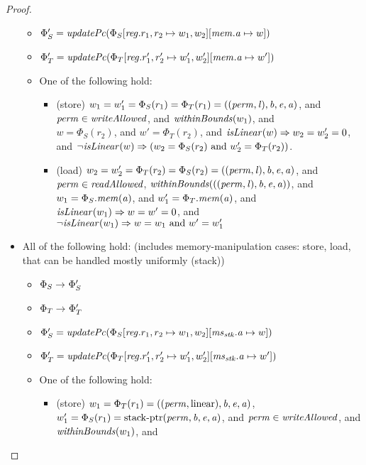 \documentclass[a4paper]{article}
\begin{document}
\begin{proof}
\begin{itemize}
\begin{itemize}
  \item $\Phi_S' =
    \updPcAddr{\Phi_S\updReg{r_1,r_2}{w_1,w_2}\update{\mem.\aaddr}{w}}$
  \item $\Phi_T' =
    \updPcAddr{\Phi_T\updReg{r_1',r_2'}{w_1',w_2'}\update{\mem.\aaddr}{w'}}$
  \item One of the following hold:
    \begin{itemize}
    \item (store) $w_1 = w_1' = \Phi_S(r_1) = \Phi_T(r_1) =
      ((\mathit{perm},\mathit{l}),\mathit{b},\mathit{e},\mathit{a})$, and $\perm \in \writeAllowed{}$,
      and
      $\withinBounds{w_1}$, and\\
      $w = \Phi_S(r_2)$, and $w' = \Phi_T(r_2)$, and $\isLinear{w} \Rightarrow
      w_2 = w_2' = 0$, and $\neg \isLinear{w} \Rightarrow (w_2 = \Phi_S(r_2)
      \text{ and } w_2' = \Phi_T(r_2))$.
    \item (load) $w_2 = w_2' = \Phi_T(r_2) = \Phi_S(r_2) =
      ((\mathit{perm},\mathit{l}),\mathit{b},\mathit{e},\mathit{a})$, and $\perm \in \readAllowed{}$,
      $\withinBounds{((\perm,\lin),\baddr,\eaddr,\aaddr)}$, and \\
      $w_1 = \Phi_S.\mathit{mem}(\mathit{a})$, and $w_1' = \Phi_T.\mathit{mem}(\mathit{a})$, and \\
      $\isLinear{w_1} \Rightarrow w = w' = 0$, and \\
      $\neg \isLinear{w_1} \Rightarrow w = w_1 \text{ and } w' = w_1'$
    \end{itemize}
  \end{itemize}
\item All of the following hold: (includes memory-manipulation cases: store, load, that can be handled mostly uniformly (stack))
  \begin{itemize}
  \item $\Phi_S \rightarrow^{} \Phi_S'$
  \item $\Phi_T \rightarrow^{} \Phi_T'$
  \item $\Phi_S' =
    \updPcAddr{\Phi_S\updReg{r_1,r_2}{w_1,w_2}\update{\ms_\stk.\aaddr}{w}}$
  \item $\Phi_T' =
    \updPcAddr{\Phi_T\updReg{r_1',r_2'}{w_1',w_2'}\update{\ms_\stk.\aaddr}{w'}}$
  \item One of the following hold:
    \begin{itemize}
    \item (store) $w_1 = \Phi_T(r_1) = ((\mathit{perm},\mathrm{linear}),\mathit{b},\mathit{e},\mathit{a})$, $w_1' =  \Phi_S(r_1) = \mathrm{stack\text{-}ptr}(\mathit{perm},\mathit{b},\mathit{e},\mathit{a})$, and $\perm \in \writeAllowed{}$,
      and
      $\withinBounds{w_1}$, and\\

\end{itemize}
\end{itemize}
\end{itemize}
\end{proof}
\end{document}
